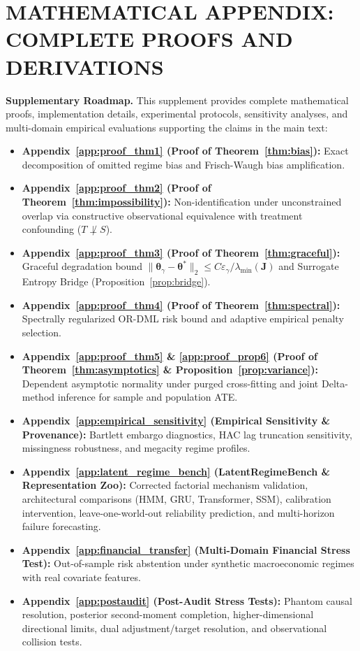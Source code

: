 \documentclass[twoside]{article}
\theoremstyle{definition}
\begin{document}
\section*{MATHEMATICAL APPENDIX: COMPLETE PROOFS AND DERIVATIONS}

\noindent\textbf{Supplementary Roadmap.} This supplement provides complete mathematical proofs, implementation details, experimental protocols, sensitivity analyses, and multi-domain empirical evaluations supporting the claims in the main text:
\begin{itemize}\setlength{\itemsep}{-2pt}\setlength{\parskip}{0pt}
    \item \textbf{Appendix~\ref{app:proof_thm1} (Proof of Theorem~\ref{thm:bias}):} Exact decomposition of omitted regime bias and Frisch-Waugh bias amplification.
    \item \textbf{Appendix~\ref{app:proof_thm2} (Proof of Theorem~\ref{thm:impossibility}):} Non-identification under unconstrained overlap via constructive observational equivalence with treatment confounding ($T \not\perp S$).
    \item \textbf{Appendix~\ref{app:proof_thm3} (Proof of Theorem~\ref{thm:graceful}):} Graceful degradation bound $\|\boldsymbol{\theta}_\gamma - \boldsymbol{\theta}^*\|_2 \le C\varepsilon_\gamma / \lambda_{\min}(\boldsymbol{J})$ and Surrogate Entropy Bridge (Proposition~\ref{prop:bridge}).
    \item \textbf{Appendix~\ref{app:proof_thm4} (Proof of Theorem~\ref{thm:spectral}):} Spectrally regularized OR-DML risk bound and adaptive empirical penalty selection.
    \item \textbf{Appendix~\ref{app:proof_thm5} \& \ref{app:proof_prop6} (Proof of Theorem~\ref{thm:asymptotics} \& Proposition~\ref{prop:variance}):} Dependent asymptotic normality under purged cross-fitting and joint Delta-method inference for sample and population ATE.
    \item \textbf{Appendix~\ref{app:empirical_sensitivity} (Empirical Sensitivity \& Provenance):} Bartlett embargo diagnostics, HAC lag truncation sensitivity, missingness robustness, and megacity regime profiles.
    \item \textbf{Appendix~\ref{app:latent_regime_bench} (LatentRegimeBench \& Representation Zoo):} Corrected factorial mechanism validation, architectural comparisons (HMM, GRU, Transformer, SSM), calibration intervention, leave-one-world-out reliability prediction, and multi-horizon failure forecasting.
    \item \textbf{Appendix~\ref{app:financial_transfer} (Multi-Domain Financial Stress Test):} Out-of-sample risk abstention under synthetic macroeconomic regimes with real covariate features.
    \item \textbf{Appendix~\ref{app:postaudit} (Post-Audit Stress Tests):} Phantom causal resolution, posterior second-moment completion, higher-dimensional directional limits, dual adjustment/target resolution, and observational collision tests.
\end{itemize}
\end{document}

